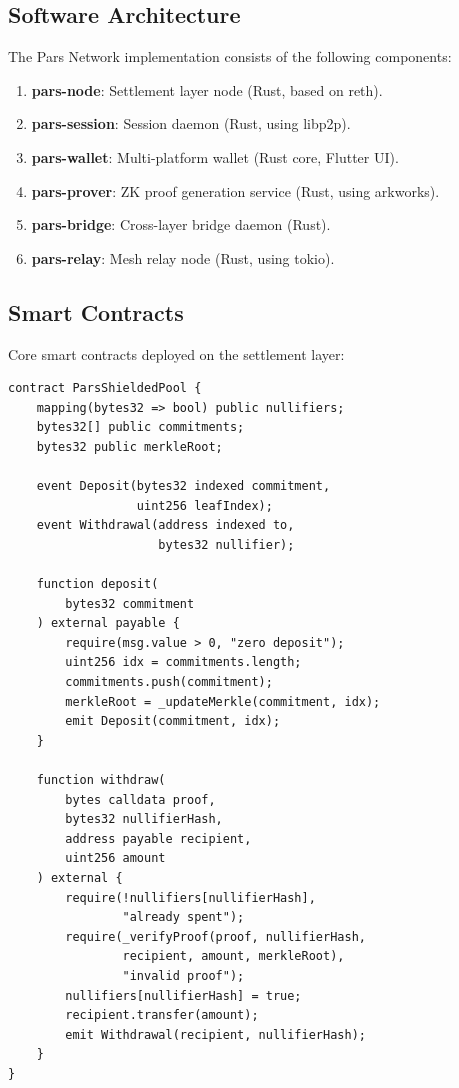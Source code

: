 \documentclass[11pt,a4paper,twocolumn]{article}
\begin{document}
\subsection{Software Architecture}

The Pars Network implementation consists of the following components:

\begin{enumerate}[leftmargin=*]
  \item \textbf{pars-node}: Settlement layer node (Rust, based on reth).
  \item \textbf{pars-session}: Session daemon (Rust, using libp2p).
  \item \textbf{pars-wallet}: Multi-platform wallet (Rust core, Flutter UI).
  \item \textbf{pars-prover}: ZK proof generation service (Rust, using arkworks).
  \item \textbf{pars-bridge}: Cross-layer bridge daemon (Rust).
  \item \textbf{pars-relay}: Mesh relay node (Rust, using tokio).
\end{enumerate}

\subsection{Smart Contracts}

Core smart contracts deployed on the settlement layer:

\begin{lstlisting}[style=solidity, caption={Pars Shielded Pool (simplified)}]
contract ParsShieldedPool {
    mapping(bytes32 => bool) public nullifiers;
    bytes32[] public commitments;
    bytes32 public merkleRoot;

    event Deposit(bytes32 indexed commitment,
                  uint256 leafIndex);
    event Withdrawal(address indexed to,
                     bytes32 nullifier);

    function deposit(
        bytes32 commitment
    ) external payable {
        require(msg.value > 0, "zero deposit");
        uint256 idx = commitments.length;
        commitments.push(commitment);
        merkleRoot = _updateMerkle(commitment, idx);
        emit Deposit(commitment, idx);
    }

    function withdraw(
        bytes calldata proof,
        bytes32 nullifierHash,
        address payable recipient,
        uint256 amount
    ) external {
        require(!nullifiers[nullifierHash],
                "already spent");
        require(_verifyProof(proof, nullifierHash,
                recipient, amount, merkleRoot),
                "invalid proof");
        nullifiers[nullifierHash] = true;
        recipient.transfer(amount);
        emit Withdrawal(recipient, nullifierHash);
    }
}
\end{lstlisting}
\end{document}
